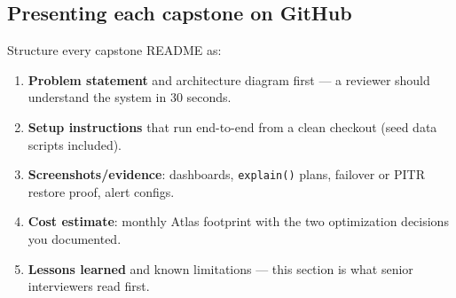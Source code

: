 \documentclass[11pt, a4paper]{article}
\begin{document}
\subsection*{Presenting each capstone on GitHub}
Structure every capstone README as:
\begin{enumerate}[itemsep=0pt]
    \item \textbf{Problem statement} and architecture diagram first --- a reviewer should understand the system in 30 seconds.
    \item \textbf{Setup instructions} that run end-to-end from a clean checkout (seed data scripts included).
    \item \textbf{Screenshots/evidence}: dashboards, \texttt{explain()} plans, failover or PITR restore proof, alert configs.
    \item \textbf{Cost estimate}: monthly Atlas footprint with the two optimization decisions you documented.
    \item \textbf{Lessons learned} and known limitations --- this section is what senior interviewers read first.
\end{enumerate}
\end{document}
